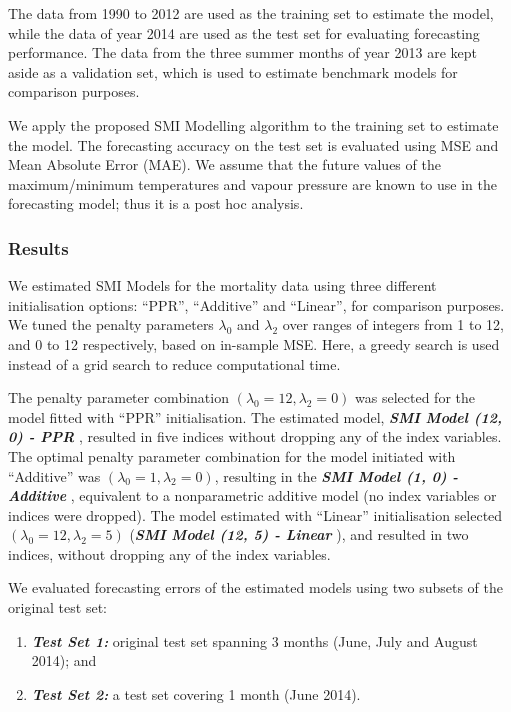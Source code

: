 \documentclass[
  11pt,
  a4paper,
]{article}
\providecommand{\tightlist}{%
  \setlength{\itemsep}{0pt}\setlength{\parskip}{0pt}}\usepackage{longtable,booktabs,array}
\begin{document}
The data from 1990 to 2012 are used as the training set to estimate the
model, while the data of year 2014 are used as the test set for
evaluating forecasting performance. The data from the three summer
months of year 2013 are kept aside as a validation set, which is used to
estimate benchmark models for comparison purposes.

We apply the proposed SMI Modelling algorithm to the training set to
estimate the model. The forecasting accuracy on the test set is
evaluated using MSE and Mean Absolute Error (MAE). We assume that the
future values of the maximum/minimum temperatures and vapour pressure
are known to use in the forecasting model; thus it is a post hoc
analysis.

\subsubsection{Results}\label{results}

We estimated SMI Models for the mortality data using three different
initialisation options: ``PPR'', ``Additive'' and ``Linear'', for
comparison purposes. We tuned the penalty parameters \(\lambda_{0}\) and
\(\lambda_{2}\) over ranges of integers from 1 to 12, and 0 to 12
respectively, based on in-sample MSE. Here, a greedy search is used
instead of a grid search to reduce computational time.

The penalty parameter combination
\((\lambda_{0} = 12, \lambda_{2} = 0)\) was selected for the model
fitted with ``PPR'' initialisation. The estimated model,
\textbf{\emph{SMI Model (12, 0) - PPR }}, resulted in five indices
without dropping any of the index variables. The optimal penalty
parameter combination for the model initiated with ``Additive'' was
\((\lambda_{0} = 1, \lambda_{2} = 0)\), resulting in the
\textbf{\emph{SMI Model (1, 0) - Additive }}, equivalent to a
nonparametric additive model (no index variables or indices were
dropped). The model estimated with ``Linear'' initialisation selected
\((\lambda_{0} = 12, \lambda_{2} = 5)\) (\textbf{\emph{SMI Model (12, 5)
- Linear }}), and resulted in two indices, without dropping any of the
index variables.

We evaluated forecasting errors of the estimated models using two
subsets of the original test set:

\begin{enumerate}
\def\labelenumi{\arabic{enumi}.}
\tightlist
\item
  \textbf{\emph{Test Set 1:}} original test set spanning 3 months (June,
  July and August 2014); and
\item
  \textbf{\emph{Test Set 2:}} a test set covering 1 month (June 2014).
\end{enumerate}
\end{document}
